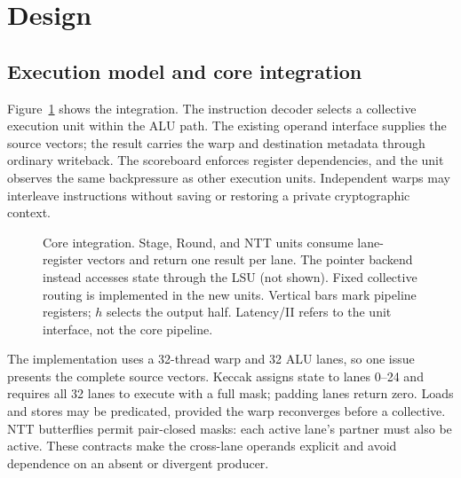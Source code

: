 \documentclass[conference,letterpaper]{IEEEtran}
\begin{document}
\section{Design}
\subsection{Execution model and core integration}
Figure~\ref{fig:core} shows the integration. The instruction decoder selects
a collective execution unit within the ALU path. The existing operand
interface supplies the source vectors; the result carries the warp and
destination metadata through ordinary writeback. The scoreboard enforces
register dependencies, and the unit observes the same backpressure as
other execution units. Independent warps may interleave instructions
without saving or restoring a private cryptographic context.

\begin{figure}[t]
\centering
\caption{Core integration. Stage, Round, and NTT units consume lane-register
vectors and return one result per lane. The pointer backend instead accesses state through the LSU (not shown).
Fixed collective routing is implemented in the new units.
Vertical bars mark pipeline registers; $h$ selects the output half.
Latency/II refers to the unit interface, not the core pipeline.}
\label{fig:core}
\end{figure}

The implementation uses a 32-thread warp and 32 ALU lanes, so one issue
presents the complete source vectors. Keccak assigns state to lanes 0--24
and requires all 32 lanes to execute with a full mask; padding lanes return
zero. Loads and stores may be predicated, provided the warp reconverges
before a collective. NTT butterflies permit pair-closed masks: each active
lane's partner must also be active. These contracts make the cross-lane
operands explicit and avoid dependence on an absent or divergent producer.
\end{document}
